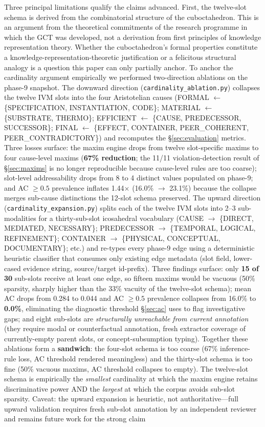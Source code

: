 \documentclass{iosart2x}
\begin{document}
Three principal limitations qualify the claims advanced. First, the twelve-slot schema is derived from the combinatorial structure of the cuboctahedron. This is an argument from the theoretical commitments of the research programme in which the GCT was developed, not a derivation from first principles of knowledge representation theory. Whether the cuboctahedron's formal properties constitute a knowledge-representation-theoretic justification or a felicitous structural analogy is a question this paper can only partially anchor. To anchor the cardinality argument empirically we performed two-direction ablations on the phase-9 snapshot. The downward direction (\texttt{cardinality\_ablation.py}) collapses the twelve IVM slots into the four Aristotelian causes (FORMAL $\leftarrow$ \{SPECIFICATION, INSTANTIATION, CODE\}; MATERIAL $\leftarrow$ \{SUBSTRATE, THERMO\}; EFFICIENT $\leftarrow$ \{CAUSE, PREDECESSOR, SUCCESSOR\}; FINAL $\leftarrow$ \{EFFECT, CONTAINER, PEER\_COHERENT, PEER\_CONTRADICTORY\}) and recomputes the \S\ref{sec:evaluation} metrics. Three losses surface: the maxim engine drops from twelve slot-specific maxims to four cause-level maxims (\textbf{67\% reduction}; the 11/11 violation-detection result of \S\ref{sec:maxims} is no longer reproducible because cause-level rules are too coarse); slot-level addressability drops from 8 to 4 distinct values populated on phase-9; and AC $\geq 0.5$ prevalence inflates 1.44$\times$ (16.0\% $\rightarrow$ 23.1\%) because the collapse merges sub-cause distinctions the 12-slot schema preserved. The upward direction (\texttt{cardinality\_expansion.py}) splits each of the twelve IVM slots into 2--3 sub-modalities for a thirty-sub-slot icosahedral vocabulary (CAUSE $\rightarrow$ \{DIRECT, MEDIATED, NECESSARY\}; PREDECESSOR $\rightarrow$ \{TEMPORAL, LOGICAL, REFINEMENT\}; CONTAINER $\rightarrow$ \{PHYSICAL, CONCEPTUAL, DOCUMENTARY\}; etc.) and re-types every phase-9 edge using a deterministic heuristic classifier that consumes only existing edge metadata (slot field, lower-cased evidence string, source/target id-prefix). Three findings surface: only \textbf{15 of 30} sub-slots receive at least one edge, so fifteen maxims would be vacuous (50\% sparsity, sharply higher than the 33\% vacuity of the twelve-slot schema); mean AC drops from 0.284 to 0.044 and AC $\geq 0.5$ prevalence collapses from 16.0\% to \textbf{0.0\%}, eliminating the diagnostic threshold \S\ref{sec:ac} uses to flag investigative gaps; and eight sub-slots are \emph{structurally unreachable from current annotation} (they require modal or counterfactual annotation, fresh extractor coverage of currently-empty parent slots, or concept-subsumption typing). Together these ablations form a \textbf{sandwich}: the four-slot schema is too coarse (67\% inference-rule loss, AC threshold rendered meaningless) and the thirty-slot schema is too fine (50\% vacuous maxims, AC threshold collapses to empty). The twelve-slot schema is empirically the \emph{smallest} cardinality at which the maxim engine retains discriminative power AND the \emph{largest} at which the corpus avoids sub-slot sparsity. Caveat: the upward expansion is heuristic, not authoritative---full upward validation requires fresh sub-slot annotation by an independent reviewer and remains future work for the strong claim 
\end{document}
